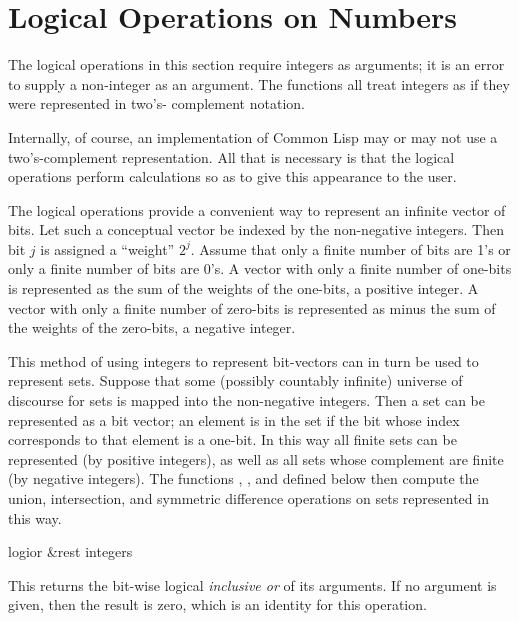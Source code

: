 \section{Logical Operations on Numbers}

The logical operations in this section require integers
as arguments; it is an error to supply a non-integer as an argument.
The functions all treat integers as if
they were represented in two's- complement notation.

\beforenoterule
\begin{implementation}
Internally, of course, an implementation of
Common Lisp may or may not use a two's-complement representation.
All that is necessary is that the logical operations
perform calculations so as to give this appearance to the user.
\end{implementation}
\afternoterule

The logical operations provide a convenient way to represent
an infinite vector of bits.  Let such a conceptual vector be
indexed by the non-negative integers.  Then bit $j$ is assigned
a ``weight'' $2^{j}$.
Assume that only a finite number of bits are 1's
or only a finite number of bits are 0's.
A vector with only a finite number of one-bits is represented
as the sum of the weights of the one-bits, a positive integer.
A vector with only a finite number of zero-bits is represented
as  minus the sum of the weights of the zero-bits, a negative integer.

This method of using integers to represent bit-vectors can in turn
be used to represent sets. Suppose that some (possibly countably
infinite) universe of discourse
for sets is mapped into the non-negative integers.
Then a set can be represented as a bit vector; an element is in the
set if the bit whose index corresponds to that element is a one-bit.
In this way all finite sets can be represented (by positive
integers), as well as all sets whose complement are finite
(by negative integers).  The functions , ,
and  defined below then compute the union,
intersection, and symmetric difference operations on sets
represented in this way.

\begin{defun}[Function]
logior &rest integers

This returns the bit-wise logical \emph{inclusive or} of its arguments.
If no argument is given, then the result is zero,
which is an identity for this operation.
\end{defun}

